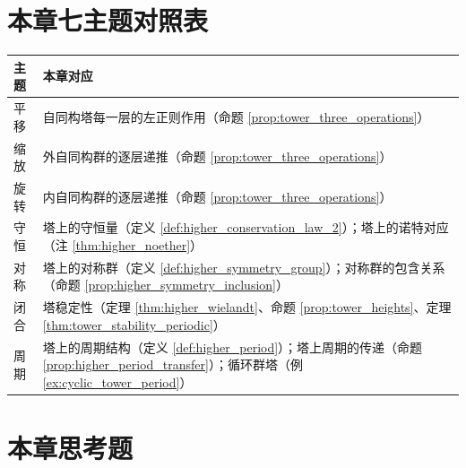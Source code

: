 \section*{本章七主题对照表}

\begin{center}
\renewcommand{\arraystretch}{1.3}
\begin{tabular}{>{\centering\arraybackslash}p{2.2cm}>{\centering\arraybackslash}p{10.5cm}}
\toprule
主题 & 本章对应 \\
\midrule
平移 & 自同构塔每一层的左正则作用（命题 \ref{prop:tower_three_operations}） \\
缩放 & 外自同构群的逐层递推（命题 \ref{prop:tower_three_operations}） \\
旋转 & 内自同构群的逐层递推（命题 \ref{prop:tower_three_operations}） \\
守恒 & 塔上的守恒量（定义 \ref{def:higher_conservation_law_2}）；塔上的诺特对应（注 \ref{thm:higher_noether}） \\
对称 & 塔上的对称群（定义 \ref{def:higher_symmetry_group}）；对称群的包含关系（命题 \ref{prop:higher_symmetry_inclusion}） \\
闭合 & 塔稳定性（定理 \ref{thm:higher_wielandt}、命题 \ref{prop:tower_heights}、定理 \ref{thm:tower_stability_periodic}） \\
周期 & 塔上的周期结构（定义 \ref{def:higher_period}）；塔上周期的传递（命题 \ref{prop:higher_period_transfer}）；循环群塔（例 \ref{ex:cyclic_tower_period}） \\
\bottomrule
\end{tabular}
\end{center}

\section*{本章思考题}

